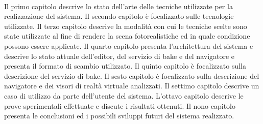 \\
Il primo capitolo descrive lo stato dell'arte delle tecniche utilizzate per la realizzazione del sistema.
Il secondo capitolo è focalizzato sulle tecnologie utilizzate.
Il terzo capitolo descrive la modalità con cui le tecniche scelte sono state utilizzate al fine di rendere la scena fotorealistiche ed in quale condizione possono essere applicate.
Il quarto capitolo presenta l'architettura del sistema e descrive lo stato attuale dell'editor, del servizio di bake e del navigatore e presenta il formato di scambio utilizzato.
Il quinto capitolo è focalizzato sulla descrizione del servizio di bake.
Il sesto capitolo è focalizzato sulla descrizione del navigatore e dei visori di realtà virtuale analizzati.
Il settimo capitolo descrive un caso di utilizzo da parte dell'utente del sistema.
L'ottavo capitolo descrive le prove sperimentali effettuate e discute i risultati ottenuti.
Il nono capitolo presenta le conclusioni ed i possibili sviluppi futuri del sistema realizzato.
